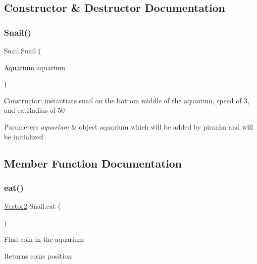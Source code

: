 \subsection{Constructor \& Destructor Documentation}
\mbox{\label{class_snail_a3d4915693af6b0c199630e178779e9c7}} 
\subsubsection{\texorpdfstring{Snail()}{Snail()}}
{\footnotesize\ttfamily Snail.\+Snail (\begin{DoxyParamCaption}\item[{\mbox{\hyperlink{class_aquarium}{Aquarium}}}]{aquarium }\end{DoxyParamCaption})\hspace{0.3cm}{\ttfamily [inline]}}

Constructor\+: instantiate snail on the bottom middle of the aquarium, speed of 3, and eat\+Radius of 50 
\begin{DoxyParams}{Parameters}
{\em aquarium} & object aquarium which will be added by piranha and will be initialized \\
\hline
\end{DoxyParams}


\subsection{Member Function Documentation}
\mbox{\label{class_snail_a91bfc5472b84f59116413ff211ffd477}} 
\subsubsection{\texorpdfstring{eat()}{eat()}}
{\footnotesize\ttfamily \mbox{\hyperlink{class_vector2}{Vector2}} Snail.\+eat (\begin{DoxyParamCaption}{ }\end{DoxyParamCaption})\hspace{0.3cm}{\ttfamily [inline]}}

Find coin in the aquarium \begin{DoxyReturn}{Returns}
coin\textquotesingle{}s position 
\end{DoxyReturn}
\mbox{\label{class_snail_a7522b5e50a9d20f2e5277776436a70af}} 
